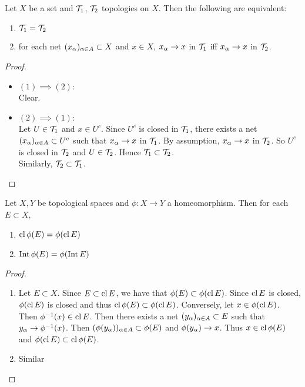 \documentclass{book}
\begin{document}
	
	\begin{ex} 
	Let $X$ be a set and $\mathcal{T}_1$, $\mathcal{T}_2$ topologies on $X$. Then the following are equivalent:
	\begin{enumerate}
		\item $\mathcal{T}_1 = \mathcal{T}_2$
		\item for each net $(x_{\alpha})_{\alpha \in A} \subset X$ and $x \in X$, $x_{\alpha} \rightarrow x$ in $\mathcal{T}_1$ iff $x_{\alpha} \rightarrow x$ in $\mathcal{T}_2$.
	\end{enumerate}
	\end{ex}

	\begin{proof}\
		\begin{itemize}
			\item $(1) \implies (2)$: \\
			Clear. \\
			\item $(2) \implies (1)$: \\
			Let $U \in \mathcal{T}_1$ and $x \in U^c$. Since $U^c$ is closed in $\mathcal{T}_1$, there exists a net $(x_{\alpha})_{\alpha \in A} \subset U^c$ such that $x_{\alpha} \rightarrow x$ in $\mathcal{T}_1$. By assumption, $x_{\alpha} \rightarrow x$ in $\mathcal{T}_2$. So $U^c$ is closed in $\mathcal{T}_2$ and $U \in \mathcal{T}_2$. Hence $\mathcal{T}_1 \subset \mathcal{T}_2$. \\
			Similarly, $\mathcal{T}_2 \subset \mathcal{T}_1$.
		\end{itemize}
	\end{proof}
	
	\begin{ex} 
		Let $X, Y$ be topological spaces and $\phi: X \rightarrow Y$ a homeomorphism. Then for each $E \subset X$, 
		\begin{enumerate}
			\item $\operatorname{cl} \phi(E) = \phi(\operatorname{cl} E)$  \item $\operatorname{Int} \phi(E) = \phi( \operatorname{Int} E)$  
		\end{enumerate} 
	\end{ex}
	
	\begin{proof}\
		\begin{enumerate}
			\item Let $E \subset X$. Since $E \subset \operatorname{cl} E$, we have that $\phi(E) \subset \phi(\operatorname{cl} E)$. Since $\operatorname{cl} E$ is closed, $\phi(\operatorname{cl} E)$ is closed and thus $\operatorname{cl} \phi(E) \subset \phi(\operatorname{cl} E)$. Conversely, let $x \in \phi(\operatorname{cl} E)$. Then $\phi^{-1}(x) \in \operatorname{cl} E$. Then there exists a net $( y_{\alpha} )_{\alpha \in A} \subset E$ such that $y_{\alpha} \rightarrow \phi^{-1}(x)$. Then $( \phi(y_{\alpha}) )_{\alpha \in A } \subset \phi(E)$ and $\phi(y_{\alpha}) \rightarrow x$. Thus $x \in \operatorname{cl} \phi(E)$ and $\phi(\operatorname{cl} E) \subset \operatorname{cl} \phi(E)$.
			\item Similar
		\end{enumerate} 
	\end{proof}
\end{document}
